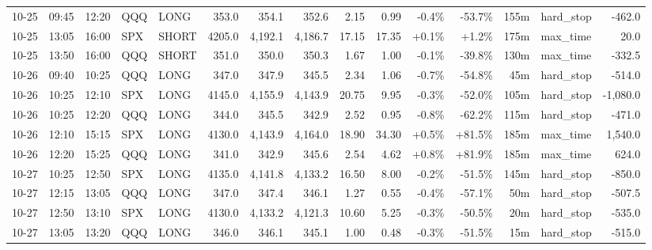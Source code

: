 \documentclass[11pt,a4paper,twoside]{article}
\begin{document}
\begin{landscape}
\begin{center}
\begin{longtable}{>{\color{txtmain}}l l l l l r r r r r r r r >{\color{txtmain}}l r}
10-25 & 09:45 & 12:20 & QQQ & LONG & 353.0 & 354.1 & 352.6 & 2.15 & 0.99 & \textcolor{lossred}{-0.4\%} & \textcolor{lossred}{-53.7\%} & 155m & hard\_stop & \textcolor{lossred}{-462.0} \\
10-25 & 13:05 & 16:00 & SPX & SHORT & 4205.0 & 4,192.1 & 4,186.7 & 17.15 & 17.35 & \textcolor{wingreen}{+0.1\%} & \textcolor{wingreen}{+1.2\%} & 175m & max\_time & \textcolor{wingreen}{20.0} \\
10-25 & 13:50 & 16:00 & QQQ & SHORT & 351.0 & 350.0 & 350.3 & 1.67 & 1.00 & \textcolor{lossred}{-0.1\%} & \textcolor{lossred}{-39.8\%} & 130m & max\_time & \textcolor{lossred}{-332.5} \\
10-26 & 09:40 & 10:25 & QQQ & LONG & 347.0 & 347.9 & 345.5 & 2.34 & 1.06 & \textcolor{lossred}{-0.7\%} & \textcolor{lossred}{-54.8\%} & 45m & hard\_stop & \textcolor{lossred}{-514.0} \\
10-26 & 10:25 & 12:10 & SPX & LONG & 4145.0 & 4,155.9 & 4,143.9 & 20.75 & 9.95 & \textcolor{lossred}{-0.3\%} & \textcolor{lossred}{-52.0\%} & 105m & hard\_stop & \textcolor{lossred}{-1,080.0} \\
10-26 & 10:25 & 12:20 & QQQ & LONG & 344.0 & 345.5 & 342.9 & 2.52 & 0.95 & \textcolor{lossred}{-0.8\%} & \textcolor{lossred}{-62.2\%} & 115m & hard\_stop & \textcolor{lossred}{-471.0} \\
10-26 & 12:10 & 15:15 & SPX & LONG & 4130.0 & 4,143.9 & 4,164.0 & 18.90 & 34.30 & \textcolor{wingreen}{+0.5\%} & \textcolor{wingreen}{+81.5\%} & 185m & max\_time & \textcolor{wingreen}{1,540.0} \\
10-26 & 12:20 & 15:25 & QQQ & LONG & 341.0 & 342.9 & 345.6 & 2.54 & 4.62 & \textcolor{wingreen}{+0.8\%} & \textcolor{wingreen}{+81.9\%} & 185m & max\_time & \textcolor{wingreen}{624.0} \\
10-27 & 10:25 & 12:50 & SPX & LONG & 4135.0 & 4,141.8 & 4,133.2 & 16.50 & 8.00 & \textcolor{lossred}{-0.2\%} & \textcolor{lossred}{-51.5\%} & 145m & hard\_stop & \textcolor{lossred}{-850.0} \\
10-27 & 12:15 & 13:05 & QQQ & LONG & 347.0 & 347.4 & 346.1 & 1.27 & 0.55 & \textcolor{lossred}{-0.4\%} & \textcolor{lossred}{-57.1\%} & 50m & hard\_stop & \textcolor{lossred}{-507.5} \\
10-27 & 12:50 & 13:10 & SPX & LONG & 4130.0 & 4,133.2 & 4,121.3 & 10.60 & 5.25 & \textcolor{lossred}{-0.3\%} & \textcolor{lossred}{-50.5\%} & 20m & hard\_stop & \textcolor{lossred}{-535.0} \\
10-27 & 13:05 & 13:20 & QQQ & LONG & 346.0 & 346.1 & 345.1 & 1.00 & 0.48 & \textcolor{lossred}{-0.3\%} & \textcolor{lossred}{-51.5\%} & 15m & hard\_stop & \textcolor{lossred}{-515.0} \\

\end{longtable}
\end{center}
\end{landscape}
\end{document}
